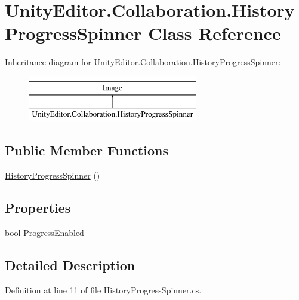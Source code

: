 \hypertarget{class_unity_editor_1_1_collaboration_1_1_history_progress_spinner}{}\section{Unity\+Editor.\+Collaboration.\+History\+Progress\+Spinner Class Reference}
\label{class_unity_editor_1_1_collaboration_1_1_history_progress_spinner}
Inheritance diagram for Unity\+Editor.\+Collaboration.\+History\+Progress\+Spinner\+:\begin{figure}[H]
\begin{center}
\leavevmode
\includegraphics[height=2.000000cm]{class_unity_editor_1_1_collaboration_1_1_history_progress_spinner}
\end{center}
\end{figure}
\subsection*{Public Member Functions}
\begin{DoxyCompactItemize}
\item 
\mbox{\hyperlink{class_unity_editor_1_1_collaboration_1_1_history_progress_spinner_abada509162abb1a4fcb5185a447fba74}{History\+Progress\+Spinner}} ()
\end{DoxyCompactItemize}
\subsection*{Properties}
\begin{DoxyCompactItemize}
\item 
bool \mbox{\hyperlink{class_unity_editor_1_1_collaboration_1_1_history_progress_spinner_a61407917e1acad9a8ea2319e0c3d6977}{Progress\+Enabled}}
\end{DoxyCompactItemize}


\subsection{Detailed Description}


Definition at line 11 of file History\+Progress\+Spinner.\+cs.



